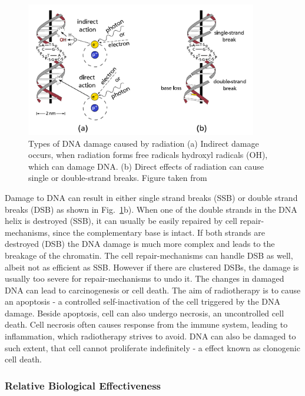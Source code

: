 \begin{figure}[H]
\begin{center}
\includegraphics[width=0.9\textwidth]{./Fundamentals/Images/SSB_DSB.png}
\caption{Types of DNA damage caused by radiation (a) Indirect damage occurs, when radiation forms free radicals hydroxyl radicals (OH), which can damage DNA. (b) Direct effects of radiation can cause single or double-strand breaks. 
Figure taken from \cite{Richter2012}}
\label{ida}
\end{center}
\end{figure}


Damage to DNA can result in either single strand breaks (SSB) or double strand breaks (DSB) as shown in Fig.~\ref{ida}b). When one of the double strands in the DNA helix is destroyed (SSB), it can usually be easily repaired by cell 
repair-mechanisms, since the complementary base is intact. If both strands are destroyed (DSB) the DNA damage is much more complex and leads to the breakage of the chromatin. The cell repair-mechanisms can handle DSB as well, 
albeit not as efficient as SSB. However if there are clustered DSBs, the damage is usually too severe for repair-mechanisms to undo it. The changes in damaged DNA can lead to carcinogenesis or cell death. The aim of radiotherapy is to 
cause an apoptosis - a controlled self-inactivation of the cell triggered by the DNA damage. Beside apoptosis, cell can also undergo necrosis, an uncontrolled cell death. Cell necrosis often causes response from the immune system, leading to inflammation, which
radiotherapy strives to avoid. DNA can also be damaged to such extent, that cell cannot proliferate indefinitely - a effect known as clonogenic cell death.


\subsubsection{Relative Biological Effectiveness}
\label{RBE}

